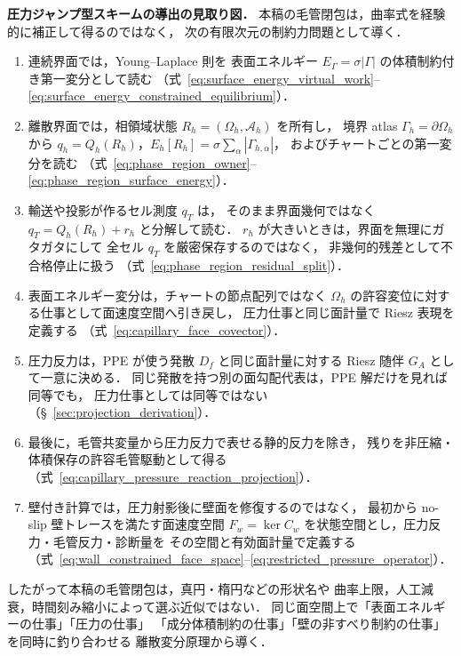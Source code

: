 \noindent\textbf{圧力ジャンプ型スキームの導出の見取り図．}
本稿の毛管閉包は，曲率式を経験的に補正して得るのではなく，
次の有限次元の制約力問題として導く．
\begin{enumerate}[noitemsep,leftmargin=2em]
  \item 連続界面では，Young--Laplace 則を
        表面エネルギー $E_\Gamma=\sigma|\Gamma|$ の体積制約付き第一変分として読む
        （式~\eqref{eq:surface_energy_virtual_work}--\eqref{eq:surface_energy_constrained_equilibrium}）．
  \item 離散界面では，相領域状態
        $R_h=(\Omega_h,\mathcal{A}_h)$ を所有し，
        境界 atlas $\Gamma_h=\partial\Omega_h$ から
        $q_h=Q_h(R_h)$，$E_h[R_h]=\sigma\sum_\alpha|\Gamma_{h,\alpha}|$，
        およびチャートごとの第一変分を読む
        （式~\eqref{eq:phase_region_owner}--\eqref{eq:phase_region_surface_energy}）．
  \item 輸送や投影が作るセル測度 $q_T$ は，
        そのまま界面幾何ではなく $q_T=Q_h(R_h)+r_h$ と分解して読む．
        $r_h$ が大きいときは，界面を無理にガタガタにして
        全セル $q_T$ を厳密保存するのではなく，
        非幾何的残差として不合格停止に扱う
        （式~\eqref{eq:phase_region_residual_split}）．
  \item 表面エネルギー変分は，チャートの節点配列ではなく
        $\Omega_h$ の許容変位に対する仕事として面速度空間へ引き戻し，
        圧力仕事と同じ面計量で Riesz 表現を定義する
        （式~\eqref{eq:capillary_face_covector}）．
  \item 圧力反力は，PPE が使う発散 $D_f$ と同じ面計量に対する
        Riesz 随伴 $G_A$ として一意に決める．
        同じ発散を持つ別の面勾配代表は，PPE 解だけを見れば同等でも，
        圧力仕事としては同等ではない（§~\ref{sec:projection_derivation}）．
  \item 最後に，毛管共変量から圧力反力で表せる静的反力を除き，
        残りを非圧縮・体積保存の許容毛管駆動として得る
        （式~\eqref{eq:capillary_pressure_reaction_projection}）．
  \item 壁付き計算では，圧力射影後に壁面を修復するのではなく，
        最初から no-slip 壁トレースを満たす面速度空間
        $F_w=\ker C_w$ を状態空間とし，圧力反力・毛管反力・診断量を
        その空間と有効面計量で定義する
        （式~\eqref{eq:wall_constrained_face_space}--\eqref{eq:restricted_pressure_operator}）．
\end{enumerate}
したがって本稿の毛管閉包は，真円・楕円などの形状名や
曲率上限，人工減衰，時間刻み縮小によって選ぶ近似ではない．
同じ面空間上で「表面エネルギーの仕事」「圧力の仕事」
「成分体積制約の仕事」「壁の非すべり制約の仕事」を同時に釣り合わせる
離散変分原理から導く．

